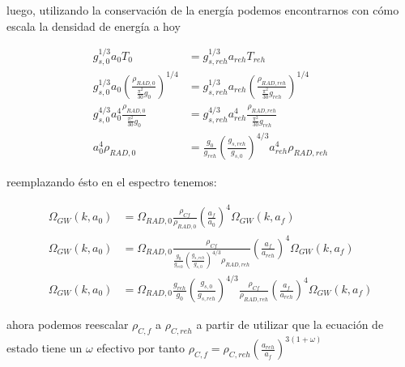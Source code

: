 \noindent
luego, utilizando la conservación de la energía podemos encontrarnos con cómo escala la densidad de energía a hoy

\begin{equation*}
    \begin{split}
        g^{1/3}_{s,0} a_0 T_0 &= g^{1/3}_{s,reh} a_{reh} T_{reh}\\
        g^{1/3}_{s,0} a_0 \left( \frac{\rho_{RAD,0}}{\frac{\pi^2}{30} g_{0}} \right)^{1/4} &= g^{1/3}_{s,reh} a_{reh} \left( \frac{\rho_{RAD,reh}}{\frac{\pi^2}{30} g_{reh}} \right)^{1/4}\\
        g^{4/3}_{s,0} a_0^4 \frac{\rho_{RAD,0}}{\frac{\pi^2}{30} g_{0}} &= g^{4/3}_{s,reh} a_{reh}^4 \frac{\rho_{RAD,reh}}{\frac{\pi^2}{30} g_{reh}}\\
        a_0^4 \rho_{RAD,0} &= \frac{g_0}{g_{reh}} \left( \frac{g_{s,reh}}{g_{s,0}} \right)^{4/3} a_{reh}^4 \rho_{RAD,reh}
    \end{split}
\end{equation*}

\noindent
reemplazando ésto en el espectro tenemos:

\begin{equation*}
    \begin{split}
        \Omega_{GW} (k, a_0) &= \Omega_{RAD,0} \frac{\rho_{Cf}}{\rho_{RAD,0}} \left( \frac{a_f}{a_0} \right)^4 \Omega_{GW} \left( k, a_f \right)\\
        \Omega_{GW} (k, a_0) &= \Omega_{RAD,0} \frac{\rho_{Cf}}{\frac{g_0}{g_{reh}} \left( \frac{g_{s,reh}}{g_{s,0}} \right)^{4/3} \rho_{RAD,reh}} \left( \frac{a_f}{a_{reh}} \right)^4 \Omega_{GW} \left( k, a_f \right)\\
        \Omega_{GW} (k, a_0) &= \Omega_{RAD,0} \frac{g_{reh}}{g_{0}} \left( \frac{g_{s,0}}{g_{s,reh}} \right)^{4/3} \frac{\rho_{Cf}}{\rho_{RAD,reh}} \left( \frac{a_f}{a_{reh}} \right)^4 \Omega_{GW} \left( k, a_f \right)
    \end{split}
\end{equation*}

\noindent
ahora podemos reescalar $\rho_{C,f}$ a $\rho_{C,reh}$ a partir de utilizar que la ecuación de estado tiene un $\omega$ efectivo por tanto $\displaystyle \rho_{C,f} = \rho_{C,reh} \left( \frac{a_{reh}}{a_f} \right)^{3(1 + \omega)}$

